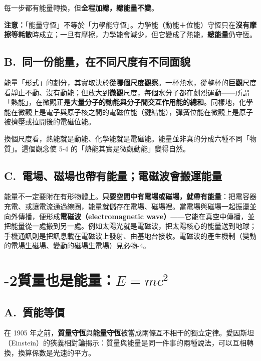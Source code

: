 \documentclass[11pt]{article}
\begin{document}
每一步都有能量轉換，但\textbf{全程加總，總能量不變}。


\textbf{注意：}「能量守恆」不等於「力學能守恆」。力學能（動能＋位能）守恆只在\textbf{沒有摩擦等耗散}時成立；一旦有摩擦，力學能會減少，但它變成了熱能，\textbf{總能量}仍守恆。

\subsection*{\sffamily B.\ 同一份能量，在不同尺度有不同面貌}

能量「形式」的劃分，其實取決於\textbf{從哪個尺度觀察}。一杯熱水，從整杯的\textbf{巨觀}尺度看靜止不動、沒有動能；但放大到\textbf{微觀}尺度，每個水分子都在劇烈運動——所謂「熱能」，在微觀正是\textbf{大量分子的動能與分子間交互作用能的總和}。同樣地，化學能在微觀上是電子與原子核之間的電磁位能（鍵結能），彈簧位能在微觀上是原子被擠壓或拉開後的電磁位能。

換個尺度看，熱能就是動能、化學能就是電磁能。能量並非真的分成六種不同「物質」。這個觀念使 5-4 的「熱能其實是微觀動能」變得自然。

\subsection*{\sffamily C.\ 電場、磁場也帶有能量；電磁波會搬運能量}

能量不一定要附在有形物體上。\textbf{只要空間中有電場或磁場，就帶有能量}：把電容器充電、或讓電流通過線圈，能量就儲存在電場、磁場裡。當電場與磁場一起振盪並向外傳播，便形成\textbf{電磁波（electromagnetic wave）}——它能在真空中傳播，並把能量從一處搬到另一處。例如太陽光就是電磁波，把太陽核心的能量送到地球；手機通訊則是把訊息載在電磁波上發射、由基地台接收。電磁波的產生機制（變動的電場生磁場、變動的磁場生電場）見必物-4。

\section*{-2\quad 質量也是能量：$E=mc^2$}

\subsection*{\sffamily A.\ 質能等價}

在 1905 年之前，\textbf{質量守恆}與\textbf{能量守恆}被當成兩條互不相干的獨立定律。愛因斯坦（Einstein）的狹義相對論揭示：質量與能量是同一件事的兩種說法，可以互相轉換，換算係數是光速的平方。
\end{document}
